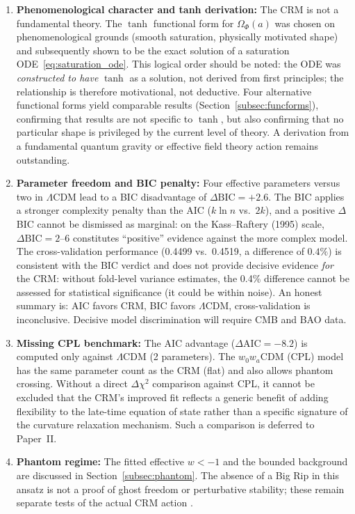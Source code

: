 \documentclass[aps,prd,twocolumn,superscriptaddress,nofootinbib]{revtex4-2}
\begin{document}
\begin{enumerate}
\item \textbf{Phenomenological character and tanh derivation:} The CRM is not a fundamental theory. The $\tanh$ functional form for $\Omega_\Phi(a)$ was chosen on phenomenological grounds (smooth saturation, physically motivated shape) and subsequently shown to be the exact solution of a saturation ODE~\eqref{eq:saturation_ode}. This logical order should be noted: the ODE was \textit{constructed to have} $\tanh$ as a solution, not derived from first principles; the relationship is therefore motivational, not deductive. Four alternative functional forms yield comparable results (Section~\ref{subsec:funcforms}), confirming that results are not specific to $\tanh$, but also confirming that no particular shape is privileged by the current level of theory. A derivation from a fundamental quantum gravity or effective field theory action remains outstanding.
\item \textbf{Parameter freedom and BIC penalty:} Four effective parameters versus two in $\Lambda$CDM lead to a BIC disadvantage of $\Delta\mathrm{BIC} = +2.6$. The BIC applies a stronger complexity penalty than the AIC ($k\ln n$ vs.\ $2k$), and a positive $\Delta$BIC cannot be dismissed as marginal: on the Kass--Raftery (1995) scale, $\Delta\mathrm{BIC} = 2$--$6$ constitutes ``positive'' evidence against the more complex model. The cross-validation performance (0.4499 vs.\ 0.4519, a difference of $0.4\%$) is consistent with the BIC verdict and does not provide decisive evidence \textit{for} the CRM: without fold-level variance estimates, the 0.4\% difference cannot be assessed for statistical significance (it could be within noise). An honest summary is: AIC favors CRM, BIC favors $\Lambda$CDM, cross-validation is inconclusive. Decisive model discrimination will require CMB and BAO data.
\item \textbf{Missing CPL benchmark:} The AIC advantage ($\Delta\mathrm{AIC} = -8.2$) is computed only against $\Lambda$CDM (2 parameters). The $w_0w_a$CDM (CPL) model \cite{Chevallier2001, Linder2003} has the same parameter count as the CRM (flat) and also allows phantom crossing. Without a direct $\Delta\chi^2$ comparison against CPL, it cannot be excluded that the CRM's improved fit reflects a generic benefit of adding flexibility to the late-time equation of state rather than a specific signature of the curvature relaxation mechanism. Such a comparison is deferred to Paper~II.
\item \textbf{Phantom regime:} The fitted effective $w<-1$ and the bounded background are discussed in Section~\ref{subsec:phantom}. The absence of a Big Rip in this ansatz is not a proof of ghost freedom or perturbative stability; these remain separate tests of the actual CRM action \cite{Sotiriou2010}.

\end{enumerate}
\end{document}

